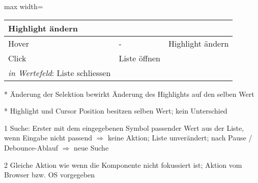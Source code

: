 \begin{table}[!htb]
\begin{adjustbox}{max width=\textwidth}
\begin{threeparttable}
\begin{tabular}{ l || l | l }
{                                                                                   Highlight ändern}        \\
                \hline
                Hover      & -                               & Highlight ändern                             \\
                \hline
                Click      & Liste öffnen                    & \tbbr{\emph{in Liste}: Selektion ändern \\
                                                                     \emph{in Wertefeld}: Liste schliessen} \\
                \hline
            \end{tabular}
            \begin{tablenotes}
                \scriptsize
                \item[*] Änderung der Selektion bewirkt Änderung des Highlights auf den selben Wert
                \item[*] Highlight und Cursor Position besitzen selben Wert; kein Unterschied
                \item
                \item[1] Suche: Erster mit dem eingegebenen Symbol passender Wert aus der Liste, wenn Eingabe nicht passend $\Rightarrow$ keine Aktion; 
                                Liste unverändert; nach Pause / Debounce-Ablauf $\Rightarrow$ neue Suche
                \item[2] Gleiche Aktion wie wenn die Komponente nicht fokussiert ist; Aktion vom Browser bzw. OS vorgegeben
            \end{tablenotes}
        \end{threeparttable}
    \end{adjustbox}
\end{table}
